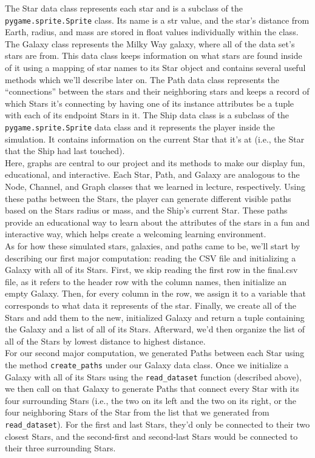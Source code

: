 \documentclass[fontsize=11pt]{article}
\begin{document}
The Star data class represents each star and is a subclass of the \texttt{pygame.sprite.Sprite} class. Its name is a str value, and the star’s distance from Earth, radius, and mass are stored in float values individually within the class. The Galaxy class represents the Milky Way galaxy, where all of the data set's stars are from. This data class keeps information on what stars are found inside of it using a mapping of star names to its Star object and contains several useful methods which we’ll describe later on. The Path data class represents the “connections” between the stars and their neighboring stars and keeps a record of which Stars it’s connecting by having one of its instance attributes be a tuple with each of its endpoint Stars in it. The Ship data class is a subclass of the \texttt{pygame.sprite.Sprite} data class and it represents the player inside the simulation. It contains information on the current Star that it’s at (i.e., the Star that the Ship had last touched).\\

Here, graphs are central to our project and its methods to make our display fun, educational, and interactive. Each Star, Path, and Galaxy are analogous to the Node, Channel, and Graph classes that we learned in lecture, respectively. Using these paths between the Stars, the player can generate different visible paths based on the Stars radius or mass, and the Ship’s current Star. These paths provide an educational way to learn about the attributes of the stars in a fun and interactive way, which helps create a welcoming learning environment.\\

As for how these simulated stars, galaxies, and paths came to be, we’ll start by describing our first major computation: reading the CSV file and initializing a Galaxy with all of its Stars. First, we skip reading the first row in the final.csv file, as it refers to the header row with the column names, then initialize an empty Galaxy. Then, for every column in the row, we assign it to a variable that corresponds to what data it represents of the star. Finally, we create all of the Stars and add them to the new, initialized Galaxy and return a tuple containing the Galaxy and a list of all of its Stars. Afterward, we’d then organize the list of all of the Stars by lowest distance to highest distance.\\

For our second major computation, we generated Paths between each Star using the method \texttt{create\_paths} under our Galaxy data class. Once we initialize a Galaxy with all of its Stars using the \texttt{read\_dataset} function (described above), we then call  on that Galaxy to generate Paths that connect every Star with its four surrounding Stars (i.e., the two on its left and the two on its right, or the four neighboring Stars of the Star from the list that we generated from \texttt{read\_dataset}). For the first and last Stars, they’d only be connected to their two closest Stars, and the second-first and second-last Stars would be connected to their three surrounding Stars.\\
\end{document}
